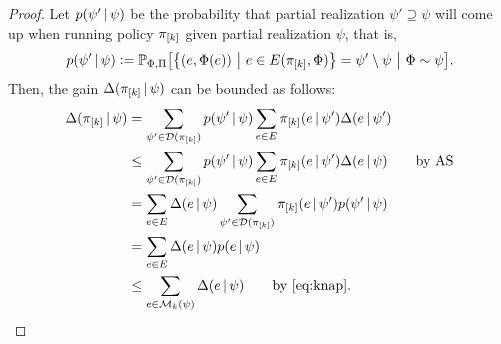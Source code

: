 \begin{proof}
  Let $p(\psi'\,\vert\,\psi)$ be the probability that partial realization $\psi' \supseteq \psi$ will come up when running policy $\pi_{[k]}$ given partial realization $\psi$, that is,
  \begin{align*}
    p(\psi'\mmid\psi) \defeq \P[\Phi, \Pi]{\sdef{\left(e, \Phi(e)\right)}{e \in E(\pik, \Phi)} = \psi'\setminus\psi}[\Phi \sim \psi].
  \end{align*}
  Then, the gain $\Delta(\pi_{[k]}\,\vert\,\psi)$ can be bounded as follows:
  \begin{align*}
    \D{\pik}{\psi} &= \sum_{\psi' \in \dom(\pik)}p(\psi'\mmid\psi)\sum_{e \in E}\pik(e\mmid\psi')\D{e}{\psi'}\\
    &\leq \sum_{\psi' \in \dom(\pik)}p(\psi'\mmid\psi)\sum_{e \in E}\pik(e\mmid\psi')\D{e}{\psi} \tag*{by AS}\\
    &= \sum_{e \in E}\D{e}{\psi} \sum_{\psi' \in \dom(\pik)}\pik(e\mmid\psi')p(\psi'\mmid\psi)\\
    &= \sum_{e \in E}\D{e}{\psi} p(e\mmid\psi)\\
    &\leq \sum_{e \in \mathcal{M}_k(\psi)} \D{e}{\psi} \tag*{by \eqref{eq:knap}}.
  \end{align*}
\end{proof}

